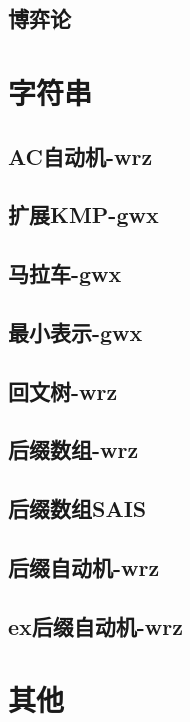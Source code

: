 \documentclass[titlepage,a4paper,10pt]{article}
\begin{document}
\begin{multicols}{2}
\begin{spacing}{0.8}
			\subsection{博弈论}
				
		\section{字符串}
			\subsection{AC自动机-wrz}
				
			\subsection{扩展KMP-gwx}
				
			\subsection{马拉车-gwx}
				
			\subsection{最小表示-gwx}
				
			\subsection{回文树-wrz}
				
			\subsection{后缀数组-wrz}
				
			\subsection{后缀数组SAIS}
				
			\subsection{后缀自动机-wrz}
				
			\subsection{ex后缀自动机-wrz}
				
		\section{其他}

\end{spacing}
\end{multicols}
\end{document}
